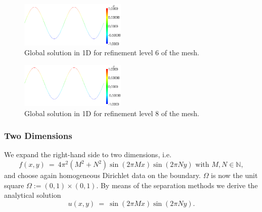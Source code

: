\documentclass[a4paper, 11pt, twoside]{article}
\begin{document}
\begin{figure}[h!]
	\centering
		\includegraphics[width=0.45\textwidth]{fig/u_poisson_tut_1d_lvl6_M2_trans.png}
\caption{Global solution in 1D for refinement level 6 of the mesh.}
\label{1dsol6}
\end{figure}

\begin{figure}[h!]
	\centering
		\includegraphics[width=0.45\textwidth]{fig/u_poisson_tut_1d_lvl8_M2_trans.png}
\caption{Global solution in 1D for refinement level 8 of the mesh.}
\label{1dsol8}
\end{figure}

\newpage

\subsubsection{Two Dimensions}\label{sectiontwodimensions}
We expand the right-hand side to two dimensions, i.e.
\begin{equation}
f(x,y)\ =\ 4 \pi^2 (M^2 + N^2) \sin(2 \pi M x ) \sin(2 \pi N y) \text{ with } M,N\in \mathbb{N}, 
\end{equation}
and choose again homogeneous Dirichlet data on the boundary. $\Omega$ is now the unit square $\Omega:=(0,1)\times(0,1)$. By means of the separation methods we derive the analytical solution 
\begin{equation}\label{exactSolution}
u(x,y)\ =\ \sin(2 \pi M x ) \sin(2 \pi N y).  
\end{equation}
\end{document}
